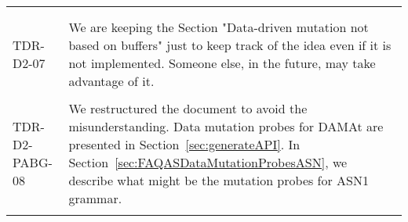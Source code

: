 \begin{longtable}{|p{1.5cm}|p{12cm}|@{}}
\begin{minipage}{12cm}
\end{minipage}\\
\\
\hline

TDR-D2-07&
\begin{minipage}{12cm}
We are keeping the Section "Data-driven mutation not based on buffers" just to keep track of the idea even if it is not implemented. Someone else, in the future, may take advantage of it.

\end{minipage}\\
\\
\hline


TDR-D2-PABG-08&
\begin{minipage}{12cm}
We restructured the document to avoid the misunderstanding. Data mutation probes for DAMAt are presented in Section~\ref{sec:generateAPI}. In Section~\ref{sec:FAQASDataMutationProbesASN}, we describe what might be the mutation probes for ASN1 grammar.

\end{minipage}\\
\\
\hline
                                       
\end{longtable}
\normalsize

\clearpage